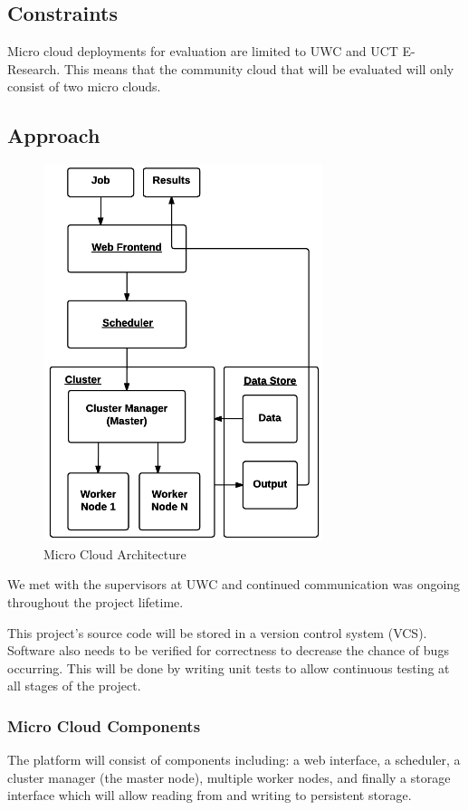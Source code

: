 \documentclass{sig-alternate-05-2015}
\begin{document}
\subsection{Constraints}
Micro cloud deployments for evaluation are limited to UWC and UCT E-Research. This means that the community cloud that will be evaluated will only consist of two micro clouds.

\subsection{Approach}
\begin{figure}
\centering
\includegraphics[scale=0.8]{img/microcloud_architecture}
\caption{Micro Cloud Architecture}
\end{figure}

We met with the supervisors at UWC and continued communication was ongoing throughout the project lifetime. 

This project's source code will be stored in a version control system (VCS). Software also needs to be verified for correctness to decrease the chance of bugs occurring. This will be done by writing unit tests to allow continuous testing at all stages of the project.


\subsubsection{Micro Cloud Components}
The platform will consist of components including: a web interface, a scheduler, a cluster manager (the master node), multiple worker nodes, and finally a storage interface which will allow reading from and writing to persistent storage. 
\end{document}
